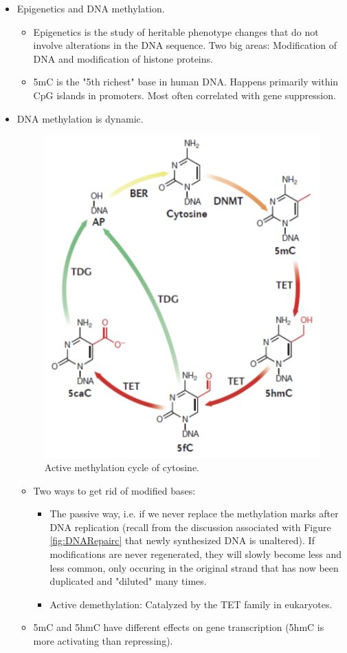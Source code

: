 \documentclass[../notes.tex]{subfiles}
\begin{document}
\begin{itemize}
    \item Epigenetics and DNA methylation.
    \begin{itemize}
        \item Epigenetics is the study of heritable phenotype changes that do not involve alterations in the DNA sequence. Two big areas: Modification of DNA and modification of histone proteins.
        \item 5mC is the "5th richest" base in human DNA. Happens primarily within CpG islands in promoters. Most often correlated with gene suppression.
    \end{itemize}
    \item DNA methylation is dynamic.
    \begin{figure}[h!]
        \centering
        \includegraphics[width=0.4\linewidth]{../ExtFiles/activeMeth.png}
        \caption{Active methylation cycle of cytosine.}
        \label{fig:activeMeth}
    \end{figure}
    \begin{itemize}
        \item Two ways to get rid of modified bases:
        \begin{itemize}
            \item The passive way, i.e. if we never replace the methylation marks after DNA replication (recall from the discussion associated with Figure \ref{fig:DNARepairc} that newly synthesized DNA is unaltered). If modifications are never regenerated, they will slowly become less and less common, only occuring in the original strand that has now been duplicated and "diluted" many times.
            \item Active demethylation: Catalyzed by the TET family in eukaryotes.
        \end{itemize}
        \item 5mC and 5hmC have different effects on gene transcription (5hmC is more activating than repressing).

\end{itemize}
\end{itemize}
\end{document}

